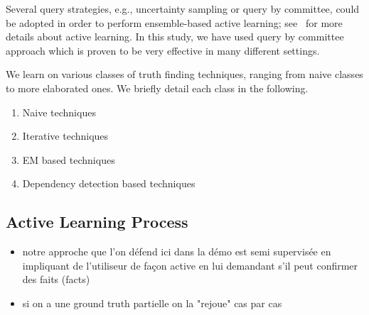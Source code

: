 Several query strategies, e.g., uncertainty sampling or query by committee, could be adopted in order to perform ensemble-based active
learning; see~\cite{burr12} for more details about active learning. In this study, we have used query by committee approach which is proven
to be very effective in many different settings.



We learn on various classes of truth finding techniques, ranging from naive classes to more elaborated ones. We
briefly detail each class in the following.
\begin{enumerate}
 \item Naive techniques
 \item Iterative techniques
 \item EM based techniques
 \item Dependency detection based techniques
\end{enumerate}



\subsection{Active Learning Process}
\begin{itemize}
 \item notre approche que l'on défend ici dans la démo est  semi supervisée en impliquant de l'utiliseur de façon active
en lui demandant s'il peut confirmer des faits (facts)
\item si on a une ground truth partielle on la "rejoue" cas par cas
\end{itemize}

